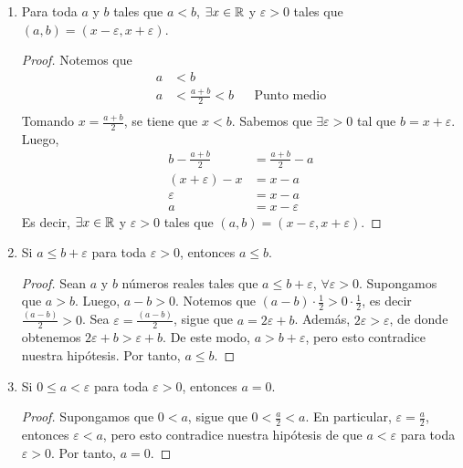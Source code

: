 \begin{enumerate}[label=\alph*)]
\clearpage\pagebreak
  
  \item Para toda $a$ y $b$ tales que $a<b$, $\exists x\in \mathbb{R}$ y $\varepsilon>0$ tales que $(a, b)= (x- \varepsilon, x+\varepsilon)$.
  \begin{proof}\leavevmode
    Notemos que
    \begin{align*}
      a &< b\\
      a &< \frac{a+b}{2} < b && \text{Punto medio}\\
    \end{align*}
    Tomando $x=\frac{a+b}{2}$, se tiene que $x<b$. Sabemos que $\exists \varepsilon>0$ tal que $b=x+\varepsilon$. Luego,
    \begin{align*}
      b-\frac{a+b}{2} &= \frac{a+b}{2}-a\\
      (x+\varepsilon) - x &= x - a\\
      \varepsilon &= x - a\\
      a &= x - \varepsilon
    \end{align*}
    Es decir, $\exists x\in \mathbb{R}$ y $\varepsilon>0$ tales que $(a, b)= (x- \varepsilon, x+\varepsilon)$.
  \end{proof}
    
  \item Si $a \leq b + \varepsilon$ para toda $\varepsilon > 0$, entonces $a \leq b$.
 
  \begin{proof} 
   Sean $a$ y $b$ números reales tales que $a \leq b + \varepsilon$, $\forall \varepsilon > 0$. Supongamos que $a > b$. Luego, $a-b>0$. Notemos que $(a-b) \cdot \frac{1}{2} > 0 \cdot \frac{1}{2}$, es decir $\frac{(a-b)}{2} > 0$. Sea $\varepsilon = \frac{(a-b)}{2}$, sigue que $a=2\varepsilon+b$. Además, $2\varepsilon > \varepsilon$, de donde obtenemos $2 \varepsilon + b > \varepsilon + b$. De este modo, $a > b+\varepsilon$, pero esto contradice nuestra hipótesis. Por tanto, $a \leq b$. 
  \end{proof}
  
 \item Si $0 \leq a < \varepsilon$ para toda $\varepsilon > 0$, entonces $a=0$.
 
 \begin{proof} 
  Supongamos que $0<a$, sigue que $0<\frac{a}{2}<a$. En particular, $\varepsilon=\frac{a}{2}$, entonces $\varepsilon<a$, pero esto contradice nuestra hipótesis de que $a< \varepsilon$ para toda $\varepsilon>0$. Por tanto, $a=0$. 
 \end{proof}


\end{enumerate}
